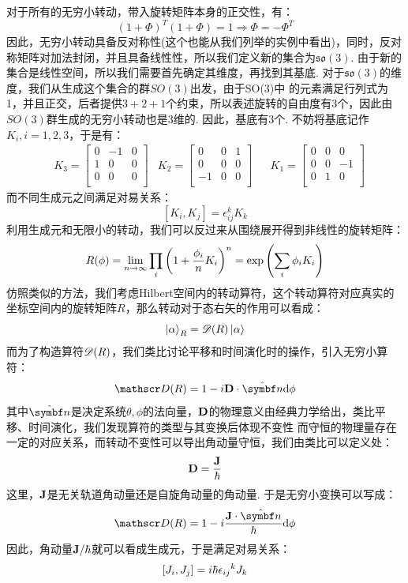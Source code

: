 对于所有的无穷小转动，带入旋转矩阵本身的正交性，有：
\[
(1 + \Phi)^{T}(1 + \Phi) = 1 \Longrightarrow \Phi = -\Phi^{T}
\]
因此，无穷小转动具备反对称性(这个也能从我们列举的实例中看出)，同时，反对称矩阵对加法封闭，并且具备线性性，所以我们定义新的集合为\(\mathfrak{so}(3)\). 
由于新的集合是线性空间，所以我们需要首先确定其维度，再找到其基底. 对于\(\mathfrak{so}(3)\)的维度，我们从生成这个集合的群\(SO(3)\)出发，由于SO(3)中
的元素满足行列式为1，并且正交，后者提供\(3+2+1\)个约束，所以表述旋转的自由度有\(3\)个，因此由\(SO(3)\)群生成的无穷小转动也是3维的. 因此，基底有3个. 
不妨将基底记作\(K_{i},i=1,2,3\)，于是有：
\begin{align*}
&K_{3} = 
\begin{bmatrix}
0 & -1 & 0 \\
1 & 0  & 0 \\
0 & 0  & 0 \\
\end{bmatrix}
& K_{2} = 
\begin{bmatrix}
0 & 0 &  1 \\
0 & 0  & 0 \\
-1 & 0 & 0 \\
\end{bmatrix}
&& K_{1} = 
\begin{bmatrix}
0 & 0  & 0 \\
0 & 0 & -1 \\
0 & 1 & 0 \\
\end{bmatrix}
\end{align*}
而不同生成元之间满足对易关系：
\[
[K_{i},K_{j}] = \epsilon_{ij}^{k}K_{k}
\]
利用生成元和无限小的转动，我们可以反过来从围绕展开得到非线性的旋转矩阵：
\[
R(\phi) = \lim_{n\to\infty}\prod_{i}\left({1+\frac{\phi_{i}}{n}K_{i}}\right)^{n} = \exp\left({\sum_{i}\phi_{i}K_{i}}\right)
\]
仿照类似的方法，我们考虑Hilbert空间内的转动算符，这个转动算符对应真实的坐标空间内的旋转矩阵\(R\)，那么转动对于态右矢的作用可以看成：
\[
\ket{\alpha}_{R} = \mathscr{D}(R)\ket{\alpha}
\]
而为了构造算符\(\mathscr{D}(R)\)，我们类比讨论平移和时间演化时的操作，引入无穷小算符：
\[
\rotate(R) = 1 - i\mathbf{D}\cdot\uv{n}\dd\phi
\]
其中\(\uv{n}\)是决定系统\(\theta,\phi\)的法向量，\(\mathbf{D}\)的物理意义由经典力学给出，类比平移、时间演化，我们发现算符的类型与其变换后体现不变性
而守恒的物理量存在一定的对应关系，而转动不变性可以导出角动量守恒，我们由类比可以定义处：
\[
\mathbf{D} = \frac{\mathbf{J}}{\hbar}
\]
这里，\(\mathbf{J}\)是无关轨道角动量还是自旋角动量的角动量. 于是无穷小变换可以写成：
\[
\rotate(R) = 1 - i\frac{\vJ\cdot\uv{n}}{\hh}\dd\phi
\]
因此，角动量\(\mathbf{J}/\hbar\)就可以看成生成元，于是满足对易关系：
\[
[J_{i},J_{j}] = i\hbar{\epsilon_{ij}}^{k}J_{k}
\]
